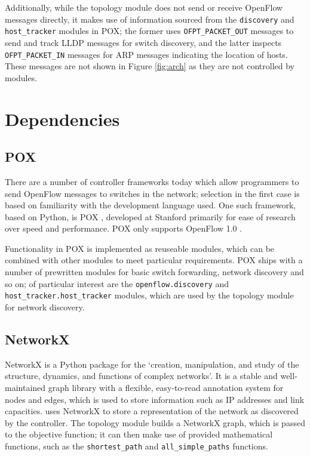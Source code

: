 Additionally, while the topology module does not send or receive OpenFlow messages directly, it makes use of information sourced from the \texttt{discovery} and \texttt{host\_tracker} modules in POX; the former uses \texttt{OFPT\_PACKET\_OUT} messages to send and track LLDP messages for switch discovery, and the latter inspects \texttt{OFPT\_PACKET\_IN} messages for ARP messages indicating the location of hosts. These messages are not shown in Figure \ref{fig:arch} as they are not controlled by \thesis{} modules.

\section{Dependencies}
\subsection{POX}
There are a number of controller frameworks today which allow programmers to send OpenFlow messages to switches in the network; selection in the first case is based on familiarity with the development language used. One such framework, based on Python, is POX \cite{onl:pox}, developed at Stanford primarily for ease of research over speed and performance. POX only supports OpenFlow 1.0 \cite{onf:switch100}.

Functionality in POX is implemented as reuseable modules, which can be combined with other modules to meet particular requirements. POX ships with a number of prewritten modules for basic switch forwarding, network discovery and so on; of particular interest are the \texttt{openflow.discovery} and \texttt{host\_tracker.host\_tracker} modules, which are used by the \thesis{} topology module for network discovery.


\subsection{NetworkX}
NetworkX is a Python package for the `creation, manipulation, and study of the structure, dynamics, and functions of complex networks'. It is a stable and well-maintained graph library with a flexible, easy-to-read annotation system for nodes and edges, which is used to store information such as IP addresses and link capacities. \thesis{} uses NetworkX to store a representation of the network as discovered by the controller. The topology module builds a NetworkX graph, which is passed to the objective function; it can then make use of provided mathematical functions, such as the \texttt{shortest\_path} and \texttt{all\_simple\_paths} functions.

